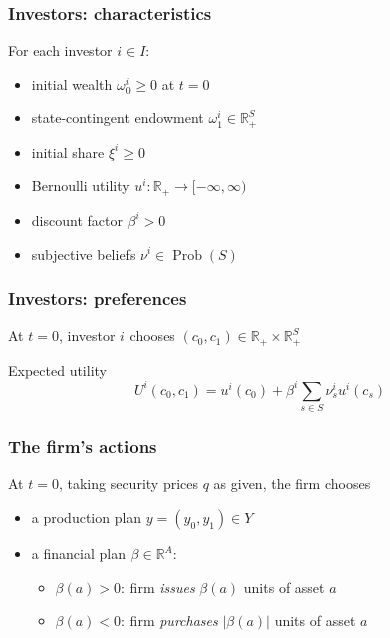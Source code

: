 \documentclass[blue]{beamer}
\def\R{\mathbb{R}}
\def\geq{\geqslant}
\DeclareMathOperator\Prob{Prob}
\theoremstyle{definition}
\theoremstyle{example}
\begin{document}
\begin{frame}\frametitle{Investors: characteristics}
For each investor $i \in I$:
\begin{itemize}
\item initial wealth $\omega^i_0 \geq 0$ at $t=0$
\item state-contingent endowment $\omega^i_1 \in \R^S_+$
\item initial share $\xi^i \geq 0$
\item Bernoulli utility $u^i : \R_+ \to [-\infty, \infty)$
\item discount factor $\beta^i > 0$
\item subjective beliefs $\nu^i \in \Prob(S)$
\end{itemize}
\end{frame}

\begin{frame}\frametitle{Investors: preferences}
At $t=0$, investor $i$ chooses $(c_0, c_1) \in \R_+ \times \R^S_+$
\bigskip

\begin{block}{Expected utility}
\begin{equation*}
U^i(c_0, c_1) = u^i(c_0) + \beta^i \sum_{s \in S} \nu^i_s u^i(c_s)
\end{equation*}
\end{block}
\end{frame}

\begin{frame}\frametitle{The firm's actions}
At $t=0$, taking security prices $q$ as given, the firm chooses
\bigskip

\begin{itemize}
\item a production plan $y = (y_0, y_1) \in Y$
\item a financial plan $\beta \in \R^A$:
    \begin{itemize}
    \item $\beta(a) > 0$: firm \emph{issues} $\beta(a)$ units of asset $a$
    \item $\beta(a) < 0$: firm \emph{purchases} $|\beta(a)|$ units of asset $a$
    \end{itemize}
\end{itemize}
\end{frame}
\end{document}

